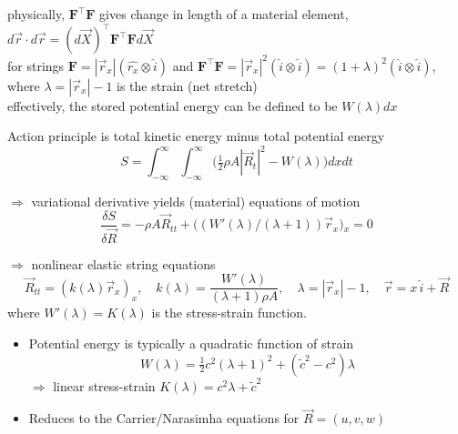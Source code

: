 \documentclass[landscape]{slides}
\begin{document}
physically, $\mathbf{F}^\top \mathbf{F}$ gives change in length of a material element, 
$d\vec{r} \cdot d\vec{r} = (d\vec{X})^\top \mathbf{F}^\top \mathbf{F} d\vec{X}$
\\

for strings
$\mathbf{F} = |\vec{r}_x| (\widehat{r_x} \otimes \hat{i})$
and
$\mathbf{F}^\top \mathbf{F} = |\vec{r}_x|^2 (\hat{i} \otimes \hat{i}) 
= (1 + \lambda)^2 (\hat{i} \otimes \hat{i})$,
where 
$\lambda = |\vec{r}_x|-1$ is the strain (net stretch)
\\

effectively, the stored potential energy can be defined to be 
$W(\lambda) dx$

\newpage

Action principle is total kinetic energy minus total potential energy 
\[
S = \int_{-\infty}^{\infty} \int_{-\infty}^{\infty} \big( \tfrac{1}{2}\rho A |\vec{R}_t|^2 -W(\lambda) \big) dx dt
\]

$\Longrightarrow$ variational derivative yields (material) equations of motion
\[
\frac{\delta S}{\delta \vec{R}} = -\rho A \vec{R}_{tt} + \big( (W'(\lambda)/(\lambda+1)) \vec{r}_x \big){}_x =0
\]

$\Longrightarrow$ nonlinear elastic string equations 
\[
\vec{R}_{tt}  = ( k(\lambda) \vec{r}_x )_x ,
\quad
k(\lambda) = \frac{W'(\lambda)}{(\lambda+1)\rho A},
\quad
\lambda = |\vec{r}_x|-1,
\quad
\vec{r} = x\,\hat{i} +\vec{R}
\]
where $W'(\lambda) = K(\lambda)$ is the stress-strain function. 
\\

\begin{itemize}
\item
Potential energy is typically a quadratic function of strain
\[
W(\lambda) = \tfrac{1}{2} c^2 (\lambda+1)^2 + ({\tilde c}^2 - c^2) \lambda
\]
$\Longrightarrow$ linear stress-strain $K(\lambda) = c^2 \lambda + {\tilde c}^2$
\item
Reduces to the Carrier/Narasimha equations for $\vec{R}=(u,v,w)$ 
\end{itemize}
\end{document}
